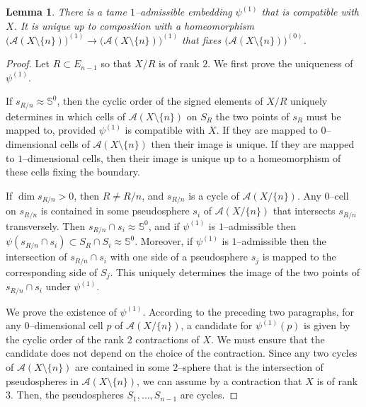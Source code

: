 \documentclass[a4paper]{amsart}
\newcommand{\p}{\mathbb S}
\newtheorem{lemma}{Lemma}
\theoremstyle{definition}
\theoremstyle{remark}
\begin{document}
\begin{lemma}\label{lem:1admissibel}
  There is a tame $1$--admissible embedding $\psi^{(1)}$ that is
  compatible with $X$. It is unique up to composition with a
  homeomorphism $\big(\mathcal A(X\setminus \{n\})\big)^{(1)}\to \big(\mathcal
  A(X\setminus \{n\})\big)^{(1)}$ that fixes $\big(\mathcal
  A(X\setminus \{n\})\big)^{(0)}$. 
\end{lemma}
\begin{proof}
  Let $R\subset E_{n-1}$ so that $X/R$ is of rank $2$.
  We first prove the uniqueness of $\psi^{(1)}$.

  If $s_{R/n}\approx \p^0$, then the cyclic order of the signed elements of
  $X/R$ uniquely determines in which
  cells of $\mathcal A(X\setminus \{n\})$ on $S_R$ the two points of $s_R$ must
  be mapped to, provided $\psi^{(1)}$ is compatible with $X$. If 
  they are mapped to $0$--dimensional cells of $\mathcal
  A(X\setminus\{n\})$ then their image is unique. If they are mapped
  to $1$--dimensional cells, then their image is unique up to a
  homeomorphism of these cells fixing the boundary.

  If $\dim s_{R/n}>0$, then $R\not= R/n$, and $s_{R/n}$ is a  cycle of
  $\mathcal A(X/\{n\})$.  
  Any $0$--cell on $s_{R/n}$ is contained in some pseudosphere $s_i$ of
  $\mathcal A(X/\{n\})$ that intersects $s_{R/n}$ transversely. 
  Then $s_{R/n}\cap s_i\approx \p^0$, and
  if $\psi^{(1)}$ is $1$--admissible then $\psi(s_{R/n}\cap s_i)\subset
  S_R\cap S_i\approx \p^0$. Moreover, if $\psi^{(1)}$ is $1$--admissible
  then the intersection of $s_{R/n}\cap s_i$ with one side of a
  pseudosphere $s_j$ is mapped to the corresponding side of $S_j$. This
  uniquely determines the image of the two points of $s_{R/n}\cap s_i$ under
  $\psi^{(1)}$.

  We prove the existence of $\psi^{(1)}$. According to the preceding two
  paragraphs, for any $0$--dimensional cell $p$ of $\mathcal A(X/\{n\})$,
  a candidate for $\psi^{(1)}(p)$ is given by the cyclic order of the rank
  $2$ contractions of $X$.  
  We must ensure that the candidate does not depend on the choice of the
  contraction.
%
  Since any two cycles of $\mathcal A(X\setminus \{n\})$ are contained
  in some $2$--sphere that is the intersection of pseudospheres in
  $\mathcal A(X\setminus \{n\})$, we can assume by a contraction that
  $X$ is of rank $3$. Then, the pseudospheres $S_1,\dots,S_{n-1}$ are
  cycles. 
  

\end{proof}
\end{document}
